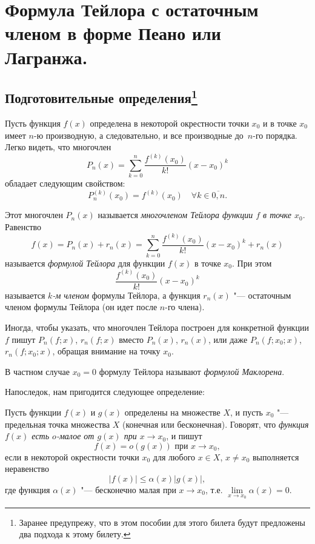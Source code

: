 \chapter{Формула Тейлора с остаточным членом в форме Пеано или Лагранжа.}

\section[Подготовительные определения]{Подготовительные определения\footnote{Заранее предупрежу, что в этом пособии для этого билета будут предложены два подхода к этому билету.}}\label{ch5:sectearldefs}

Пусть функция $f(x)$ определена в некоторой окрестности точки $x_0$ и в точке $x_0$ имеет $n$-ю производную, а следовательно, и все производные до~$n$-го порядка. Легко видеть, что многочлен
$$
P_n(x) = \sum_{k = 0}^{n} \frac{f^{(k)}(x_0)}{k!} (x - x_0)^k
$$
обладает следующим свойством:
$$
P_n^{(k)}(x_0) = f^{(k)}(x_0) \quad \forall k \in \overline{0,n}.
$$

\begin{defn}
Этот многочлен $P_n(x)$ называется \textit{многочленом Тейлора функции $f$ в точке $x_0$}. Равенство $$
f(x) = P_n(x) + r_n(x) = \sum_{k = 0}^{n} \frac{f^{(k)}(x_0)}{k!} (x - x_0)^k + r_n(x)
$$ 
называется \textit{формулой Тейлора} для функции $f(x)$ в точке $x_0$. При этом $$\frac{f^{(k)}(x_0)}{k!} (x - x_0)^k$$ называется \textit{$k$-м членом} формулы Тейлора, а функция $r_n(x)$ "--- остаточным членом формулы Тейлора (он идет после $n$-го члена).
\end{defn}

Иногда, чтобы указать, что многочлен Тейлора построен для конкретной функции $f$ пишут $P_n(f;x)$, $r_n(f;x)$ вместо $P_n(x)$, $r_n(x)$, или даже $P_n(f;x_0;x)$, $r_n(f;x_0;x)$, обращая внимание на точку $x_0$.

В частном случае $x_0=0$ формулу Тейлора называют \textit{формулой Маклорена}.

Напоследок, нам пригодится следующее определение:
\begin{defn}
Пусть функции $f(x)$ и $g(x)$ определены на множестве $X$, и пусть $x_0$ "--- предельная точка множества $X$ (конечная или бесконечная). Говорят, что \textit{функция $f(x)$ есть $o$-малое от $g(x)$ при $x\to x_0$}, и пишут
$$
f(x) = o(g(x)) \text{ при } x\to x_0,
$$ 
если в некоторой окрестности точки $x_0$ для любого $x \in X$, $x\ne x_0$ выполняется неравенство\footnotemark
$$
|f(x)| \le \alpha(x)|g(x)|,
$$
где функция $\alpha(x)$ "--- бесконечно малая при $x\to x_0$, т.е. $\lim\limits_{x\to x_0}\alpha(x)= 0$.
\end{defn}

